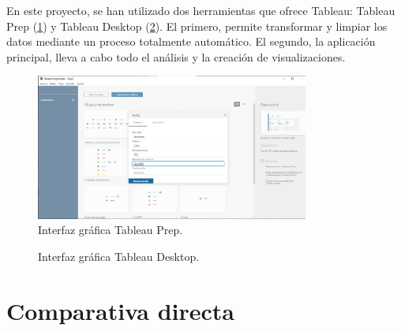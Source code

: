 \documentclass[a4paper, 12pt]{book}
\begin{document}
En este proyecto, se han utilizado dos herramientas que ofrece Tableau: Tableau Prep (\ref{figura:Tableau_Prep}) y Tableau Desktop (\ref{figura:Tableau_desktop}). El primero, permite transformar y limpiar los datos mediante un proceso totalmente automático. El segundo, la aplicación principal, lleva a cabo todo el análisis y la creación de visualizaciones. 

\begin{figure}[ht]
    \centering
        \includegraphics[width=0.8\textwidth]{img/PREP.png}
        \caption{Interfaz gráfica Tableau Prep.}
        \label{figura:Tableau_Prep}
    \end{figure}

\begin{figure}[ht]
 \centering
 \caption{Interfaz gráfica Tableau Desktop.}
 \label{figura:Tableau_desktop}
\end{figure}
    
\section{Comparativa directa}
\label{sec:comparativa}
\end{document}
